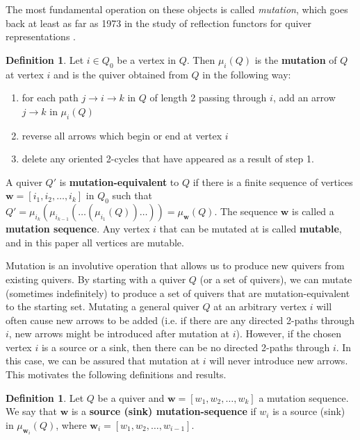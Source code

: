 \documentclass[10pt]{amsart}
\theoremstyle{definition}
\newtheorem{defi}[thm]{Definition}
\theoremstyle{remark}
\newcommand{\bw}{{\boldsymbol{w}}}
\begin{document}
The most fundamental operation on these objects is called \textit{mutation}, which goes back at least as far as 1973 in the study of reflection functors for quiver representations \cite{MR0393065}.

\begin{defi}\label{def-mutation}
    Let $i \in Q_0$ be a vertex in $Q$. 
    Then $\mu_i (Q)$ is the \textbf{mutation} of $Q$ at vertex $i$ and is the quiver obtained from $Q$ in the following way:
    \begin{enumerate}
        \item for each path $j \to i \to k$ in $Q$ of length 2 passing through $i$, add an arrow $j \to k$ in $\mu_i (Q)$
        \item reverse all arrows which begin or end at vertex $i$
        \item delete any oriented 2-cycles that have appeared as a result of step 1.
    \end{enumerate}
    A quiver $Q'$ is \textbf{mutation-equivalent} to $Q$ if there is a finite sequence of vertices $\bw = [i_1, i_2, \ldots, i_k]$ in $Q_0$ such that $Q' = \mu_{i_k}(\mu_{i_{k-1}}(\ldots(\mu_{i_1}(Q))\ldots)) = \mu_\bw(Q)$.
    The sequence $\bw$ is called a \textbf{mutation sequence}.
    Any vertex $i$ that can be mutated at is called \textbf{mutable}, and in this paper all vertices are mutable.
\end{defi}

Mutation is an involutive operation that allows us to produce new quivers from existing quivers.
By starting with a quiver $Q$ (or a set of quivers), we can mutate (sometimes indefinitely) to produce a set of quivers that are mutation-equivalent to the starting set.
Mutating a general quiver $Q$ at an arbitrary vertex $i$ will often cause new arrows to be added (i.e. if there are any directed 2-paths through $i$, new arrows might be introduced after mutation at $i$).
However, if the chosen vertex $i$ is a source or a sink, then there can be no directed 2-paths through $i$.
In this case, we can be assured that mutation at $i$ will never introduce new arrows.
This motivates the following definitions and results.

\begin{defi} \label{def-source-sink-mutation}
    Let $Q$ be a quiver and $\bw = [w_1, w_2, \dots, w_k]$ a mutation sequence.
    We say that $\bw$ is a \textbf{source (sink) mutation-sequence} if $w_i$ is a source (sink) in $\mu_{\bw_i}(Q)$, where $\bw_i = [w_1, w_2, \dots, w_{i-1}]$.
\end{defi}
\end{document}
